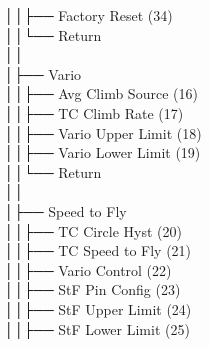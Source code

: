 │\hspace{2em}│\hspace{2em}├── Factory Reset (34) \\
│\hspace{2em}│\hspace{2em}└── Return \\
│\hspace{2em}│\hspace{2em} \\
│\hspace{2em}├── Vario \\
│\hspace{2em}│\hspace{2em}├── Avg Climb Source (16) \\
│\hspace{2em}│\hspace{2em}├── TC Climb Rate (17) \\
│\hspace{2em}│\hspace{2em}├── Vario Upper Limit (18) \\
│\hspace{2em}│\hspace{2em}├── Vario Lower Limit (19) \\
│\hspace{2em}│\hspace{2em}└── Return \\
│\hspace{2em}│\hspace{2em} \\
│\hspace{2em}├── Speed to Fly \\
│\hspace{2em}│\hspace{2em}├── TC Circle Hyst (20) \\
│\hspace{2em}│\hspace{2em}├── TC Speed to Fly (21) \\
│\hspace{2em}│\hspace{2em}├── Vario Control (22) \\
│\hspace{2em}│\hspace{2em}├── StF Pin Config (23) \\
│\hspace{2em}│\hspace{2em}├── StF Upper Limit (24) \\
│\hspace{2em}│\hspace{2em}├── StF Lower Limit (25) \\

